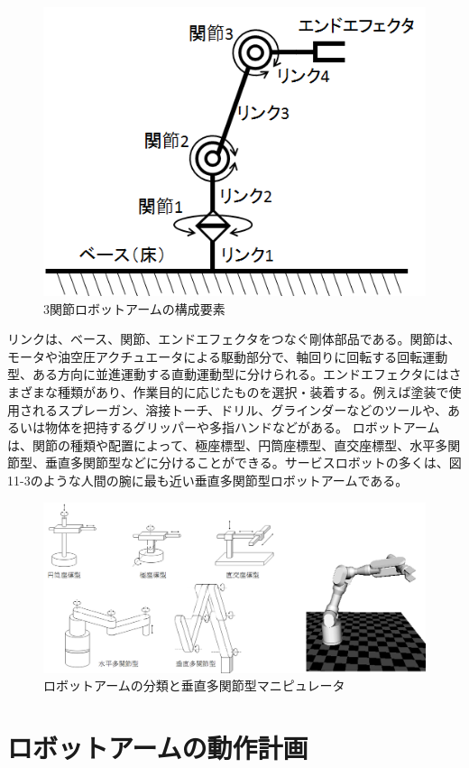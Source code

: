 \begin{figure}[ht]
  \centering
  \includegraphics[width=0.8\columnwidth]{pictures/chapter11/pic_11_01.png}
  \caption{3関節ロボットアームの構成要素}
\end{figure}

リンクは、ベース、関節、エンドエフェクタをつなぐ剛体部品である。関節は、モータや油空圧アクチュエータによる駆動部分で、軸回りに回転する回転運動型、ある方向に並進運動する直動運動型に分けられる。エンドエフェクタにはさまざまな種類があり、作業目的に応じたものを選択・装着する。例えば塗装で使用されるスプレーガン、溶接トーチ、ドリル、グラインダーなどのツールや、あるいは物体を把持するグリッパーや多指ハンドなどがある。
ロボットアームは、関節の種類や配置によって、極座標型、円筒座標型、直交座標型、水平多関節型、垂直多関節型などに分けることができる。サービスロボットの多くは、図11-3のような人間の腕に最も近い垂直多関節型ロボットアームである。

\begin{figure}[ht]
  \centering
  \includegraphics[width=0.8\columnwidth]{pictures/chapter11/pic_11_02.png}
  \caption{ロボットアームの分類と垂直多関節型マニピュレータ}
\end{figure}

\section{ロボットアームの動作計画}

